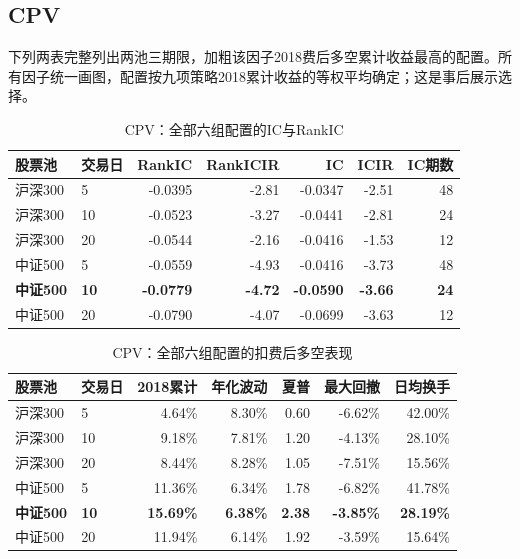 \subsection{CPV}
下列两表完整列出两池三期限，加粗该因子2018费后多空累计收益最高的配置。所有因子统一画图，配置按九项策略2018累计收益的等权平均确定；这是事后展示选择。
\begin{table}[H]\centering\normalsize\setlength{\tabcolsep}{3.5pt}
\caption{CPV：全部六组配置的IC与RankIC}\begin{tabular}{llrrrrr}\toprule
股票池 & 交易日 & RankIC & RankICIR & IC & ICIR & IC期数\\\midrule
沪深300 & 5 & -0.0395 & -2.81 & -0.0347 & -2.51 & 48 \\
沪深300 & 10 & -0.0523 & -3.27 & -0.0441 & -2.81 & 24 \\
沪深300 & 20 & -0.0544 & -2.16 & -0.0416 & -1.53 & 12 \\
中证500 & 5 & -0.0559 & -4.93 & -0.0416 & -3.73 & 48 \\
\textbf{中证500} & \textbf{10} & \textbf{-0.0779} & \textbf{-4.72} & \textbf{-0.0590} & \textbf{-3.66} & \textbf{24} \\
中证500 & 20 & -0.0790 & -4.07 & -0.0699 & -3.63 & 12 \\
\bottomrule\end{tabular}\end{table}
\begin{table}[H]\centering\normalsize\setlength{\tabcolsep}{3.5pt}
\caption{CPV：全部六组配置的扣费后多空表现}\begin{tabular}{llrrrrr}\toprule
股票池 & 交易日 & 2018累计 & 年化波动 & 夏普 & 最大回撤 & 日均换手\\\midrule
沪深300 & 5 & 4.64\% & 8.30\% & 0.60 & -6.62\% & 42.00\% \\
沪深300 & 10 & 9.18\% & 7.81\% & 1.20 & -4.13\% & 28.10\% \\
沪深300 & 20 & 8.44\% & 8.28\% & 1.05 & -7.51\% & 15.56\% \\
中证500 & 5 & 11.36\% & 6.34\% & 1.78 & -6.82\% & 41.78\% \\
\textbf{中证500} & \textbf{10} & \textbf{15.69\%} & \textbf{6.38\%} & \textbf{2.38} & \textbf{-3.85\%} & \textbf{28.19\%} \\
中证500 & 20 & 11.94\% & 6.14\% & 1.92 & -3.59\% & 15.64\% \\
\bottomrule\end{tabular}\end{table}
\clearpage
{}
\clearpage

